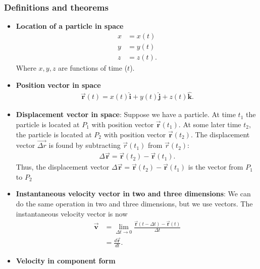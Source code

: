 \documentclass{report}
\begin{document}
    \subsubsection{Definitions and theorems}
    \begin{itemize}
        \item \textbf{Location of a particle in space}
            \begin{align*}
                x &= x(t) \\
                y &= y(t) \\
                z &= z(t)
            .\end{align*}
            Where $x,y,z$ are functions of time ($t$). 
        \item \textbf{Position vector in space}
            \begin{align*}
                \vec{\mathbf{r}}(t) = x(t)\hat{\mathbf{i}} + y(t)\hat{\mathbf{j}} + z(t)\hat{\mathbf{k}}
            .\end{align*}
        \item \textbf{Displacement vector in space}: 
            Suppose we have a particle. At time $t_{1}$ the particle is located at $P_{1}$ with position vector $\vec{\mathbf{r}}(t_{1})$. At some later time $t_{2}$, the particle is located at $P_{2}$ with position vector $\vec{\mathbf{r}}(t_{2})$. The displacement vector $\vec{\Delta r}$ is found by subtracting $\vec{r}(t_1)$ from $\vec{r}(t_2)$:
            \begin{align*}
                \Delta \vec{\mathbf{r}} = \vec{\mathbf{r}}(t_{2}) - \vec{\mathbf{r}}(t_{1})
            .\end{align*}
            Thus, the displacement vector $\Delta \vec{\mathbf{r}} = \vec{\mathbf{r}}(t_{2}) - \vec{\mathbf{r}}(t_{1})$ is the vector from $P_{1}$ to $P_{2}$
        \item \textbf{Instantaneous velocity vector in two and three dimensions}: We can do the same operation in two and three dimensions, but we use vectors. The instantaneous velocity vector is now
            \begin{align*}
                \vec{\mathbf{v}} &= \lim\limits_{\Delta t \to 0}{\frac{\vec{\mathbf{r}}(t - \Delta t)-\vec{\mathbf{r}}(t)}{\Delta t}} \\
                &=\frac{d\vec{\mathbf{r}}}{dt}
            .\end{align*}
        \item \textbf{Velocity in component form}
            \begin{align*}

\end{align*}
\end{itemize}
\end{document}
